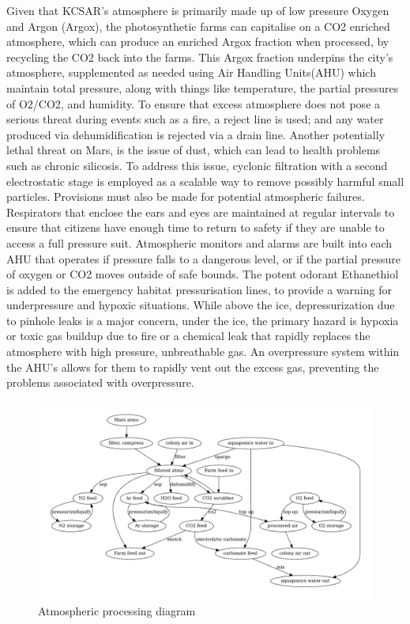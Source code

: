 \documentclass[fleqn,10pt]{Stylesheet} %
\begin{document}
Given that KCSAR’s atmosphere is primarily made up of low pressure Oxygen and Argon (Argox), the photosynthetic farms can capitalise on a CO2 enriched atmosphere, which can produce an enriched Argox fraction when processed, by recycling the CO2 back into the farms. This  Argox fraction underpins  the city’s atmosphere, supplemented as needed using Air Handling Units(AHU) which maintain total pressure, along with things like temperature, the partial pressures of O2/CO2, and humidity. To ensure that excess atmosphere does not pose a serious threat during events such as a fire, a reject line is used; and any water produced via dehumidification is rejected via a drain line. Another potentially lethal threat on Mars, is the issue of dust, which can lead to health problems such as chronic silicosis. To address this issue, cyclonic filtration with a second electrostatic stage is employed as a scalable way to remove possibly harmful small particles. Provisions must also be made for potential atmospheric failures. Respirators that enclose the ears and eyes are maintained at regular intervals to ensure that citizens have enough time to return to safety if they are unable to access a full pressure suit. Atmospheric monitors and alarms are built into each AHU that operates if pressure falls to a dangerous level, or if the partial pressure of oxygen or CO2 moves outside of safe bounds. The potent odorant Ethanethiol is added to the emergency habitat pressurisation lines, to provide a warning for underpressure and hypoxic situations. While above the ice, depressurization due to pinhole leaks is a major concern, under the ice, the primary hazard is hypoxia or toxic gas buildup due to fire or a chemical leak that rapidly replaces the atmosphere with high pressure, unbreathable gas. An overpressure system within the AHU’s allows for them to rapidly vent out the excess gas, preventing the problems associated with overpressure.

\begin{figure}
    \centering
    \includegraphics[width=\linewidth]{figures/fig_atmo.pdf}
    \caption{Atmospheric processing diagram}
    \label{fig:atmo_diagram}
\end{figure}
\end{document}
